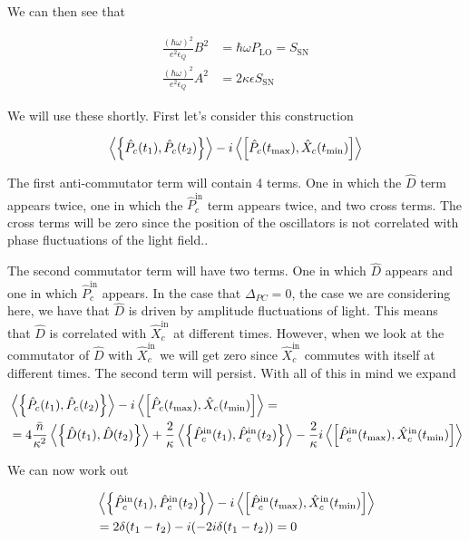 \documentclass[12pt]{article}
\begin{document}
We can then see that

\begin{align}
\frac{(\hbar \omega)^2}{e^2 \epsilon_Q} B^2 &= \hbar \omega P_{\text{LO}} = S_{\text{SN}}\\
\frac{(\hbar \omega)^2}{e^2 \epsilon_Q} A^2 &= 2 \kappa \epsilon S_{\text{SN}}
\end{align}

We will use these shortly. First let's consider this construction

\begin{align}
\Braket{\left\{\hat{P}_c(t_1),\hat{P}_c(t_2)\right\}} - i\Braket{\left[\hat{P}_c(t_{\text{max}}),\hat{X}_c(t_{\text{min}})\right]}
\end{align}

The first anti-commutator term will contain 4 terms. One in which the $\hat{D}$ term appears twice, one in which the $\hat{P}_c^{\text{in}}$ term appears twice, and two cross terms. The cross terms will be zero since the position of the oscillators is not correlated with phase fluctuations of the light field..

The second commutator term will have two terms. One in which $\hat{D}$ appears and one in which $\hat{P}_c^{\text{in}}$ appears. In the case that $\Delta_{PC} = 0$, the case we are considering here, we have that $\hat{D}$ is driven by amplitude fluctuations of light. This means that $\hat{D}$ is correlated with $\hat{X}_c^{\text{in}}$ at different times. However, when we look at the commutator of $\hat{D}$ with $\hat{X}_c^{\text{in}}$ we will get zero since $\hat{X}_c^{\text{in}}$ commutes with itself at different times. The second term will persist. With all of this in mind we expand

\begin{align}
&\Braket{\left\{\hat{P}_c(t_1),\hat{P}_c(t_2)\right\}} - i\Braket{\left[\hat{P}_c(t_{\text{max}}),\hat{X}_c(t_{\text{min}})\right]}=\\
&= 4 \frac{\bar{n}}{\kappa^2} \Braket{\left\{\hat{D}(t_1),\hat{D}(t_2)\right\}} + \frac{2}{\kappa} \Braket{\left\{\hat{P}_c^{\text{in}}(t_1),\hat{P}_c^{\text{in}}(t_2)\right\}} - \frac{2}{\kappa}i \Braket{\left[\hat{P}_c^{\text{in}}(t_{\text{max}}),\hat{X}_c^{\text{in}}(t_{\text{min}})\right]}
\end{align}

We can now work out

\begin{align}
&\Braket{\left\{\hat{P}_c^{\text{in}}(t_1),\hat{P}_c^{\text{in}}(t_2)\right\}} - i \Braket{\left[\hat{P}_c^{\text{in}}(t_{\text{max}}),\hat{X}_c^{\text{in}}(t_{\text{min}})\right]}\\
&= 2\delta(t_1-t_2) - i(-2i\delta(t_1-t_2)) = 0
\end{align}
\end{document}
